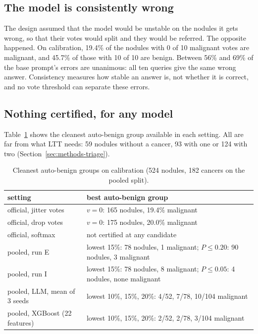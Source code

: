 \subsection{The model is consistently wrong}

The design assumed that the model would be unstable on the nodules it gets wrong, so that their
votes would split and they would be referred. The opposite happened. On calibration, 19.4\% of the
nodules with 0 of 10 malignant votes are malignant, and 45.7\% of those with 10 of 10 are benign.
Between 56\% and 69\% of the base prompt's errors are unanimous: all ten queries give the same
wrong answer. Consistency measures how stable an answer is, not whether it is correct, and no vote
threshold can separate these errors.

\subsection{Nothing certified, for any model}

Table~\ref{tab:results-ltt} shows the cleanest auto-benign group available in each setting. All
are far from what LTT needs: 59 nodules without a cancer, 93 with one or 124 with two
(Section~\ref{sec:methods-triage}).

\begin{table}[ht]
  \centering
  \small
  \caption{Cleanest auto-benign groups on calibration (524 nodules, 182 cancers on the pooled
           split).}
  \label{tab:results-ltt}
  \begin{tabular}{p{4.2cm}p{7.4cm}}
    \toprule
    setting & best auto-benign group \\
    \midrule
    official, jitter votes  & $v = 0$: 165 nodules, 19.4\% malignant \\
    official, drop votes    & $v = 0$: 175 nodules, 20.0\% malignant \\
    official, softmax       & not certified at any candidate \\
    pooled, run E           & lowest 15\%: 78 nodules, 1 malignant; $P \le 0.20$: 90 nodules, 3 malignant \\
    pooled, run I           & lowest 15\%: 78 nodules, 8 malignant; $P \le 0.05$: 4 nodules, none malignant \\
    pooled, LLM, mean of 3 seeds & lowest 10\%, 15\%, 20\%: 4/52, 7/78, 10/104 malignant \\
    pooled, XGBoost (22 features) & lowest 10\%, 15\%, 20\%: 2/52, 2/78, 3/104 malignant \\
    \bottomrule
  \end{tabular}
\end{table}


